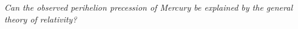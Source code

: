 \textit{Can the observed perihelion precession of Mercury be explained by the general theory of relativity?}
